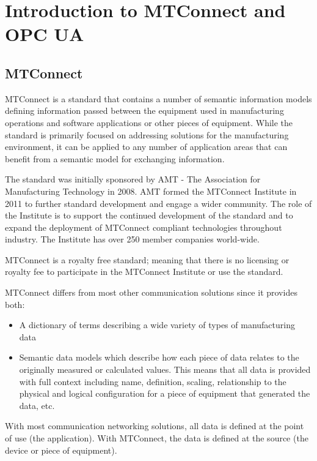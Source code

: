 \section{Introduction to MTConnect and OPC UA}\label{intro}

\subsection{MTConnect}\label{intro-to-mtconnect}

MTConnect is a standard that contains a number of semantic information models defining information passed between the equipment used in manufacturing operations and software applications or other pieces of equipment. While the standard is primarily focused on addressing solutions for the manufacturing environment, it can be applied to any number of application areas that can benefit from a semantic model for exchanging information. 
   
The standard was initially sponsored by AMT - The Association for Manufacturing Technology in 2008.  AMT formed the MTConnect Institute in 2011 to further standard development and engage a wider community. The role of the Institute is to support the continued development of the standard and to expand the deployment of MTConnect compliant technologies throughout industry. The Institute has over 250 member companies world-wide.  

MTConnect is a royalty free standard; meaning that there is no licensing or royalty fee to participate in the MTConnect Institute or use the standard.

MTConnect differs from most other communication solutions since it provides both:
\begin{itemize}
    \item A dictionary of terms describing a wide variety of types of manufacturing data
    \item Semantic data models which describe how each piece of data relates to the originally measured or calculated values. This means that all data is provided with full context including name, definition, scaling, relationship to the physical and logical configuration for a piece of equipment that generated the data, etc.
\end{itemize}

With most communication networking solutions, all data is defined at the point of use (the application).  With MTConnect, the data is defined at the source (the device or piece of equipment). 

